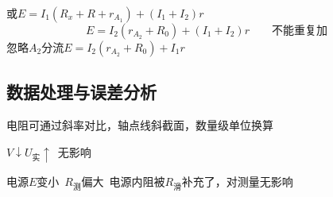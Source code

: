 \begin{problem}
\begin{solution}
或\quad $E=I_1(R_x+R+r_{A_1})+(I_1+I_2)r$
\[ E=I_2(r_{A_2}+R_0)+(I_1+I_2)r\qquad\text{不能重复加} \]
忽略$A_2$分流\quad $E=I_2(r_{A_2}+R_0)+I_1r$
\end{solution}
\end{problem}

\subsection{数据处理与误差分析}
电阻可通过斜率对比，轴点线斜截面，数量级单位换算 %

\quad $V\downarrow$\qquad $U_{\text{实}}\uparrow$\ 无影响 %

电源$E$变小\ $R_{\text{测}}$偏大\ 电源内阻被$R_{\text{滑}}$补充了，对测量无影响

